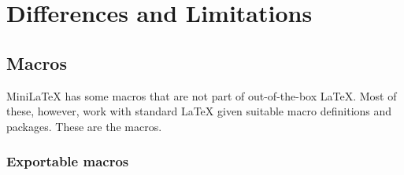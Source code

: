 \section{Differences and Limitations}

\subsection{Macros}

MiniLaTeX has some macros that are not part of out-of-the-box LaTeX. Most of these, however, work with standard LaTeX given suitable macro definitions and packages. These are the  macros.

\subsubsection{Exportable macros}

